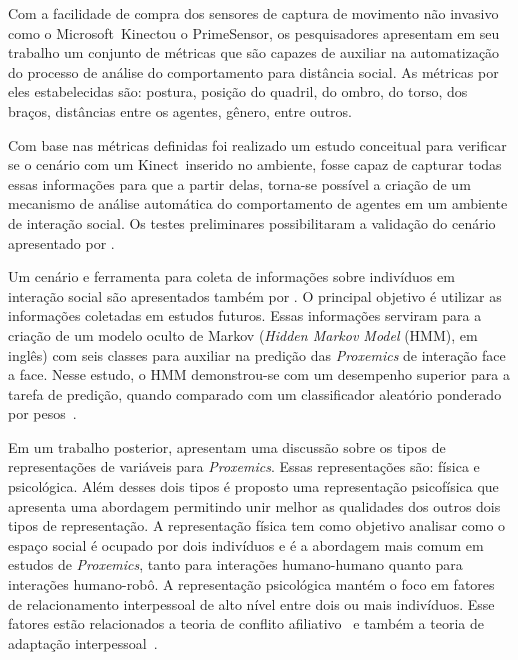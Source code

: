 Com a facilidade de compra dos sensores de captura de movimento não invasivo como o Microsoft\textregistered\ Kinect\textregistered ou o PrimeSensor\textregistered, os pesquisadores \textcite{mead:2011b} apresentam em seu trabalho um conjunto de métricas que são capazes de auxiliar na automatização do processo de análise do comportamento para distância social. As métricas por eles estabelecidas são: postura, posição do quadril, do ombro, do torso, dos braços, distâncias entre os agentes, gênero, entre outros.

Com base nas métricas definidas foi realizado um estudo conceitual para verificar se o cenário com um Kinect\textregistered\ inserido no ambiente, fosse capaz de capturar todas essas informações para que a partir delas, torna-se possível a criação de um mecanismo de análise automática do comportamento de agentes em um ambiente de interação social. Os testes preliminares possibilitaram a validação do cenário apresentado por \textcite{mead:2011b}.

Um cenário e ferramenta para coleta de informações sobre indivíduos em interação social são apresentados também por \textcite{mead:2011}. O principal objetivo é utilizar as informações coletadas em estudos futuros. Essas informações serviram para a criação de um modelo oculto de Markov (\emph{Hidden Markov Model} (HMM), em inglês) com seis classes para auxiliar na predição das \emph{Proxemics} de interação face a face. Nesse estudo, o HMM demonstrou-se com um desempenho superior para a tarefa de predição, quando comparado com um classificador aleatório ponderado por pesos~\cite{mead:2011}.

Em um trabalho posterior, \textcite{mead:2012} apresentam uma discussão sobre os tipos de representações de variáveis para \emph{Proxemics}. Essas representações são: física e psicológica. Além desses dois tipos é proposto uma representação psicofísica que apresenta uma abordagem permitindo unir melhor as qualidades dos outros dois tipos de representação. A representação física tem como objetivo analisar como o espaço social é ocupado por dois indivíduos e é a abordagem mais comum em estudos de \emph{Proxemics}, tanto para interações humano-humano quanto para interações humano-robô. A representação psicológica mantém o foco em fatores de relacionamento interpessoal de alto nível entre dois ou mais indivíduos. Esse fatores estão relacionados a teoria de conflito afiliativo~\cite{argyle:1965} e também a teoria de adaptação interpessoal~\cite{burgoon:2007}.

